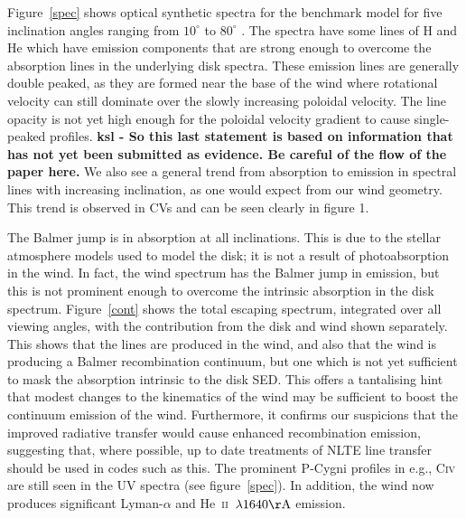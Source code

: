 \documentclass[preprint, a4paper, 11pt]{aastex}
\begin{document}
{Figure~\ref{spec} shows optical synthetic spectra for the benchmark 
model for five inclination angles ranging from $10^\circ$ to $80^\circ$ .
The spectra have some lines of H and He which have emission components that are strong enough to overcome
the absorption lines in the underlying disk spectra. These emission lines are generally double peaked, 
as they are formed near the base of the wind where rotational velocity
can still dominate over the slowly increasing poloidal velocity. The line 
opacity is not yet high enough for the poloidal velocity gradient to 
cause single-peaked profiles.  {\bf ksl - So this last statement is based on information that has not yet been submitted as evidence. Be careful of the flow of the paper here.}
We also see a general trend from absorption to emission in spectral lines
with increasing inclination, as one would expect from our wind geometry.
This trend is observed in CVs and can be seen clearly in figure 1. 

The Balmer jump is in absorption at all inclinations. This is 
due to the stellar atmosphere models used to model the disk;
it is not a result of photoabsorption in the wind.
In fact, the wind spectrum has the Balmer jump in emission, 
but this is not prominent enough
to overcome the intrinsic absorption in the disk spectrum. 
Figure~\ref{cont} shows the total escaping spectrum, integrated
over all viewing angles, with the contribution from the disk and wind
shown separately. This shows that the lines are produced in the wind,
and also that the wind is producing a Balmer recombination
continuum, but one which is not yet sufficient to mask the absorption 
intrinsic to the disk SED. This offers a tantalising hint
that modest changes to the kinematics of the wind
may be sufficient to boost the continuum emission of the wind.
Furthermore, it confirms our suspicions that the improved
radiative transfer would cause enhanced recombination emission,
suggesting that, where possible, up to date treatments of
NLTE line transfer should be used in codes such as this.
The prominent P-Cygni profiles in e.g., C\textsc{iv} are still seen
in the UV spectra (see figure~\ref{spec}). In addition, the wind 
now produces significant Lyman-$\alpha$ and
He~\textsc{ii}~$\lambda1640{\rm \AA}$  emission. 

}
\end{document}
